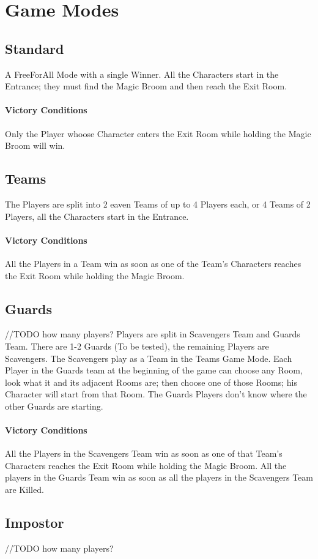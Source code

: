 \section{Game Modes}

\subsection{Standard} 
A Free\-For\-All Mode with a single Winner.
All the Characters start in the Entrance; they must find the Magic Broom and then reach the Exit Room.
\paragraph{Victory Conditions} Only the Player whoose Character enters the Exit Room while holding the Magic Broom will win.

\subsection{Teams} 
The Players are split into 2 eaven Teams of up to 4 Players each, or 4 Teams of 2 Players, all the Characters start in the Entrance.
\paragraph{Victory Conditions} All the Players in a Team win as soon as one of the Team's Characters reaches the Exit Room while holding the Magic Broom.

\subsection{Guards} //TODO how many players?
Players are split in Scavengers Team and Guards Team. There are 1-2 Guards (To be tested), the remaining Players are Scavengers.
The Scavengers play as a Team in the Teams Game Mode.
Each Player in the Guards team at the beginning of the game can choose any Room, look what it and its adjacent Rooms are; then choose one of those Rooms; his Character will start from that Room. The Guards Players don't know where the other Guards are starting.
\paragraph{Victory Conditions} All the Players in the Scavengers Team win as soon as one of that Team's Characters reaches the Exit Room while holding the Magic Broom. All the players in the Guards Team win as soon as all the players in the Scavengers Team are Killed.

\subsection{Impostor} //TODO how many players?

\pagebreak 